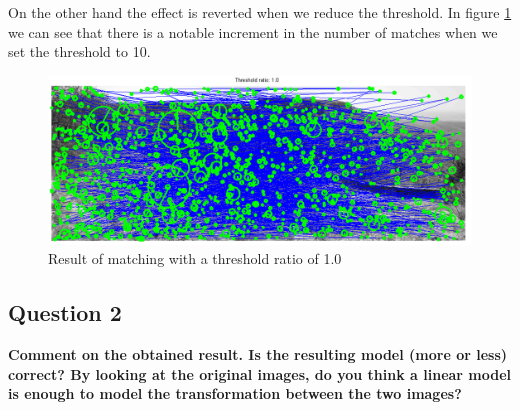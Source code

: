 On the other hand the effect is reverted when we reduce the threshold. In figure
\ref{fig:matching10thres} we can see that there is a notable increment in
the number of matches when we set the threshold to 10.

\begin{figure}[htb]
	\centering
		\includegraphics[width=\textwidth]{./img/ex1/matching_10_thres.png}
	\caption{Result of matching with a threshold ratio of 1.0}
	\label{fig:matching10thres}
\end{figure}

\subsection{Question 2}

{\bfseries Comment on the obtained result. Is the resulting model (more
or less) correct? By looking at the original images, do you think a linear model
is enough to model the transformation between the two images?}
